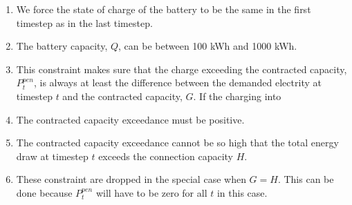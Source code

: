 \documentclass{article}
\begin{document}
\begin{enumerate}[(1)]
      \item[(12)] We force the state of charge of the battery to be the same in the first timestep as in the last timestep.

      \item[(13--14)] The battery capacity, $Q$, can be between 100 kWh and 1000 kWh.

      \item[(15)] This constraint makes sure that the charge exceeding the contracted capacity, $P^{pen}_t$,
            is always at least the difference between the demanded electrity at timestep $t$ and the contracted capacity, $G$.
            If the charging into

      \item[(16)] The contracted capacity exceedance must be positive.

      \item[(17)] The contracted capacity exceedance cannot be so high that the total energy draw at timestep $t$ exceeds the connection capacity $H$.

      \item[(16--17)] These constraint are dropped in the special case when $G = H$.
            This can be done because $P^{pen}_t$ will have to be zero for all $t$ in this case.
\end{enumerate}
\end{document}
